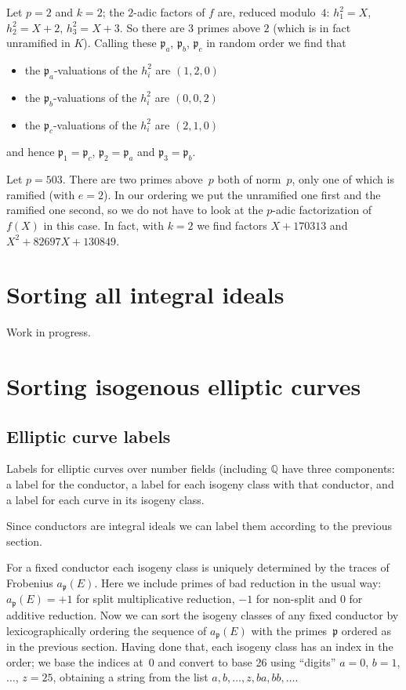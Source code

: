 \documentclass{article}
\def\Q{{\mathbb Q}}
\def\p{{\mathfrak p}}
\begin{document}
Let $p=2$ and $k=2$; the $2$-adic factors of $f$ are, reduced
modulo~$4$: $h_1^2=X$, $h_2^2=X+2$, $h_3^2=X+3$.  So there are $3$
primes above $2$ (which is in fact unramified in $K$).  Calling these
$\p_a$, $\p_b$, $\p_c$ in random order we find that
\begin{itemize}
\item the $\p_a$-valuations of the $h_i^2$ are $(1,2,0)$
\item the $\p_b$-valuations of the $h_i^2$ are $(0,0,2)$
\item the $\p_c$-valuations of the $h_i^2$ are $(2,1,0)$
\end{itemize}
and hence $\p_1=\p_c$, $\p_2=\p_a$ and $\p_3=\p_b$.

Let $p=503$.  There are two primes above~$p$ both of norm~$p$, only
one of which is ramified (with $e=2$).  In our ordering we put the
unramified one first and the ramified one second, so we do not have to
look at the $p$-adic factorization of $f(X)$ in this case.  In fact,
with $k=2$ we find factors $X+170313$ and $X^2+82697X+130849$.

\section{Sorting all integral ideals}

Work in progress.

\section{Sorting isogenous elliptic curves}

\subsection{Elliptic curve labels}

Labels for elliptic curves over number fields (including $\Q$ have
three components: a label for the conductor, a label for each isogeny
class with that conductor, and a label for each curve in its isogeny
class.

Since conductors are integral ideals we can label them according to
the previous section.

For a fixed conductor each isogeny class is uniquely determined by the
traces of Frobenius $a_{\p}(E)$.  Here we include primes of bad
reduction in the usual way: $a_{\p}(E)=+1$ for split multiplicative
reduction, $-1$ for non-split and $0$ for additive reduction.  Now we
can sort the isogeny classes of any fixed conductor by
lexicographically ordering the sequence of $a_{\p}(E)$ with the
primes~$\p$ ordered as in the previous section.  Having done that,
each isogeny class has an index in the order; we base the indices
at~$0$ and convert to base 26 using ``digits'' $a=0$, $b=1$, $\dots$,
$z=25$, obtaining a string from the list $a, b, \dots, z, ba, bb,
\dots$.
\end{document}
